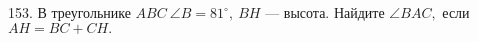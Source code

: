 153. В треугольнике $ABC\ \angle B = 81^\circ,\ BH$ --- высота. Найдите $\angle BAC,$ если $AH=BC+CH.$\\
